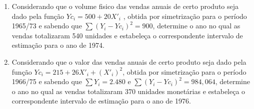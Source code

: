 \begin{enumerate}[resume]
\item Considerando que o volume fisico das vendas anuais de certo produto seja dado pela função  $ Yc_{i} = 500 + 20 X'_{i} $ , obtida por simetrização para o período 1965/73 e sabendo que $\sum (Y_{i} - Yc_{i})^{2} = 900$, determine o ano no qual as vendas totalizaram 540 unidades e estabeleça o correspondente intervalo de estimação para o ano de 1974.

\item Considerando que o valor das vendas anuais de certo produto seja dado pela função $ Yc_{i} = 215 + 26 X'_{i} + (X'_{i})^{2}$, obtida por simetrização para o período 1966/75 e sabendo que $\sum Y_{i} =2.480$ e $\sum (Y_{i} - Yc_{i})^{2} =  984,064$, determine o ano no qual as vendas totalizaram 370 unidades monetárias e estabeleça o correspondente intervalo de estimação para o ano de 1976.


\end{enumerate}	